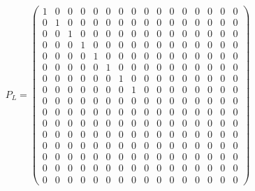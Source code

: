 \documentclass[
  10pt,
]{article}
\begin{document}
\[
P_L = \scriptstyle \begin{pmatrix} 1 & 0 & 0 & 0 & 0 & 0 & 0 & 0 & 0 & 0 & 0 & 0 & 0 & 0 & 0 & 0 \\ 0 & 1 & 0 & 0 & 0 & 0 & 0 & 0 & 0 & 0 & 0 & 0 & 0 & 0 & 0 & 0 \\ 0 & 0 & 1 & 0 & 0 & 0 & 0 & 0 & 0 & 0 & 0 & 0 & 0 & 0 & 0 & 0 \\ 0 & 0 & 0 & 1 & 0 & 0 & 0 & 0 & 0 & 0 & 0 & 0 & 0 & 0 & 0 & 0 \\ 0 & 0 & 0 & 0 & 1 & 0 & 0 & 0 & 0 & 0 & 0 & 0 & 0 & 0 & 0 & 0 \\ 0 & 0 & 0 & 0 & 0 & 1 & 0 & 0 & 0 & 0 & 0 & 0 & 0 & 0 & 0 & 0 \\ 0 & 0 & 0 & 0 & 0 & 0 & 1 & 0 & 0 & 0 & 0 & 0 & 0 & 0 & 0 & 0 \\ 0 & 0 & 0 & 0 & 0 & 0 & 0 & 1 & 0 & 0 & 0 & 0 & 0 & 0 & 0 & 0 \\ 0 & 0 & 0 & 0 & 0 & 0 & 0 & 0 & 0 & 0 & 0 & 0 & 0 & 0 & 0 & 0 \\ 0 & 0 & 0 & 0 & 0 & 0 & 0 & 0 & 0 & 0 & 0 & 0 & 0 & 0 & 0 & 0 \\ 0 & 0 & 0 & 0 & 0 & 0 & 0 & 0 & 0 & 0 & 0 & 0 & 0 & 0 & 0 & 0 \\ 0 & 0 & 0 & 0 & 0 & 0 & 0 & 0 & 0 & 0 & 0 & 0 & 0 & 0 & 0 & 0 \\ 0 & 0 & 0 & 0 & 0 & 0 & 0 & 0 & 0 & 0 & 0 & 0 & 0 & 0 & 0 & 0 \\ 0 & 0 & 0 & 0 & 0 & 0 & 0 & 0 & 0 & 0 & 0 & 0 & 0 & 0 & 0 & 0 \\ 0 & 0 & 0 & 0 & 0 & 0 & 0 & 0 & 0 & 0 & 0 & 0 & 0 & 0 & 0 & 0 \\ 0 & 0 & 0 & 0 & 0 & 0 & 0 & 0 & 0 & 0 & 0 & 0 & 0 & 0 & 0 & 0 \end{pmatrix}
\]
\end{document}

